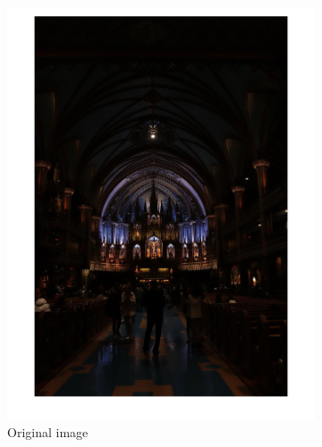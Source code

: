 \documentclass[conference]{IEEEtran}
\begin{document}
\begin{figure}[h!]
\centering
\begin{subfigure}[b]{0.4\linewidth}
\includegraphics[width=\linewidth]{images/img27.jpg}
\caption{Original image}
\end{subfigure}
\begin{subfigure}[b]{0.4\linewidth}

\end{subfigure}
\end{figure}
\end{document}
